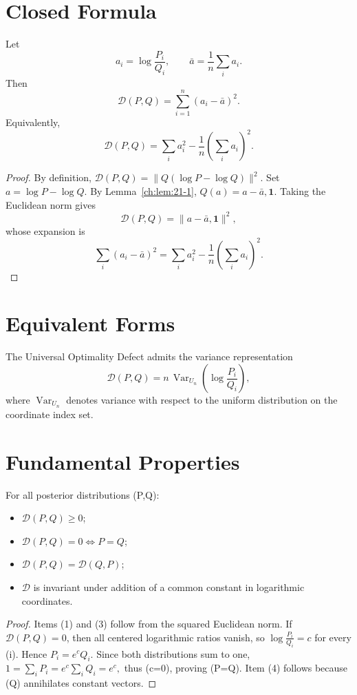 \section{Closed Formula}\label{ch:sec:closed-formula}
\begin{theorem}
\label{ch:thm:21-2}
Let
\[ a_i=\log\frac{P_i}{Q_i}, \qquad
\bar a=\frac1n\sum_{i} a_i. \]
Then
\[ \boxed{
\mathcal{D}(P,Q)
=
\sum_{i=1}^{n}(a_i-\bar a)^2.
} \]
Equivalently,
\[ \boxed{
\mathcal{D}(P,Q)
=
\sum_i a_i^2
-
\frac1n\left(\sum_i a_i\right)^2.
} \]
\begin{proof}
By definition,
$\mathcal{D}(P,Q) = \|Q(\log P-\log Q)\|^{2}.$
Set \(a=\log P-\log Q\). By Lemma~\ref{ch:lem:21-1},
$Q(a)=a-\bar a,\mathbf1.$
Taking the Euclidean norm gives
\[ \mathcal{D}(P,Q) = \|a-\bar a,\mathbf1\|^{2},
\]
whose expansion is
\[ \sum_{i}(a_i-\bar a)^{2} = \sum_{i}
a_i^{2}-\frac1n\left(\sum_{i}
a_i\right)^{2}. \]
\end{proof}
\end{theorem}
\section{Equivalent Forms}\label{ch:sec:equivalent-forms}
\begin{corollary}
\label{ch:cor:21-3}
The Universal Optimality Defect admits the variance representation
\[ \boxed{
\mathcal{D}(P,Q)
=
n\,
\operatorname{Var}_{U_n}
\!\left(
\log\frac{P_i}{Q_i}
\right),
} \]
where \(\operatorname{Var}_{U_n}\) denotes variance with respect
to the uniform distribution on the coordinate index set.
\end{corollary}
\section{Fundamental Properties}\label{ch:sec:fundamental-properties}
\begin{proposition}
\label{ch:prop:21-4}
For all posterior distributions (P,Q):
\begin{itemize}
  \item \(\mathcal{D}(P,Q)\ge0\);
  \item \(\mathcal{D}(P,Q)=0\iff P=Q\);
  \item \(\mathcal{D}(P,Q)=\mathcal{D}(Q,P)\);
  \item \(\mathcal{D}\) is invariant under addition of a common constant in logarithmic coordinates.
\end{itemize}
\begin{proof}
Items (1) and (3) follow from the squared Euclidean norm.
If \(\mathcal{D}(P,Q)=0\), then all centered logarithmic ratios
vanish, so
$\log\frac{P_i}{Q_i}=c$
for every (i). Hence \(P_i=e^{c}Q_i\). Since both distributions sum to one,
$1=\sum_{i}P_i=e^{c}\sum_{i}Q_i=e^{c},$
thus (c=0), proving (P=Q).
Item (4) follows because (Q) annihilates constant vectors.
\end{proof}
\end{proposition}
